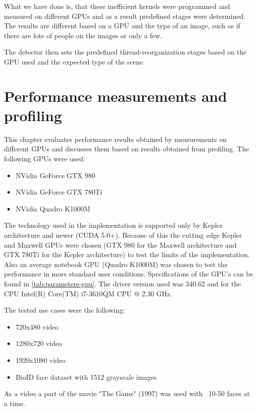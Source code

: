 What we have done is, that these inefficient kernels were programmed and measured on different GPUs and as a result predefined stages were determined. The results are different based on a GPU and the type of an image, such as if there are lots of people on the images or only a few.

The detector then sets the predefined thread-reorganization stages based on the GPU used and the expected type of the scene.

\chapter{Performance measurements and profiling}

This chapter evaluates performance results obtained by measurements on different GPUs and discusses them based on results obtained from profiling. The following GPUs were used:

\begin{itemize}
	\item NVidia GeForce GTX 980
	\item NVidia GeForce GTX 780Ti
	\item NVidia Quadro K1000M
\end{itemize}

The technology used in the implementation  is supported only by Kepler architecture and newer (CUDA 5.0+). Because of this the cutting edge Kepler and Maxwell GPUs were chosen (GTX 980 for the Maxwell architecture and GTX 780Ti for the Kepler architecture) to test the limits of the implementation. Also an average notebook GPU (Quadro K1000M) was chosen to test the performance in more standard user conditions. Specifications of the GPU's can be found in \ref{tab:parameters-gpu}. The driver version used was 340.62 and for the CPU Intel(R) Core(TM) i7-3610QM CPU @ 2.30 GHz.

The tested use cases were the following:

\begin{itemize}
	\item 720x480 video
	\item 1280x720 video
	\item 1920x1080 video
	\item BioID face dataset with 1512 grayscale images
\end{itemize}

As a video a part of the movie "The Game" (1997) was used with ~10-50 faces at a time.

